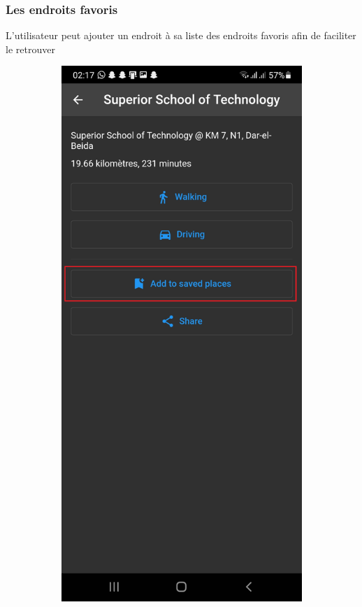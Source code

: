 \FloatBarrier

\subsubsection{Les endroits favoris}

L'utilisateur peut ajouter un endroit à sa liste des endroits favoris afin de faciliter le retrouver 
\begin{figure}[!htbp]
    \centering
    \begin{subfigure}[t]{.3\linewidth}
        \centering
         \includegraphics[width=\textwidth]{assets/app/favourites/before.png}

\end{subfigure}
\end{figure}
